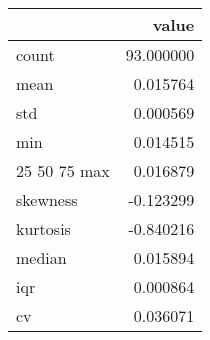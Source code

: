 \begin{tabular}{lr}
\toprule
 & value \\
\midrule
count & 93.000000 \\
mean & 0.015764 \\
std & 0.000569 \\
min & 0.014515 \\
25%
50%
75%
max & 0.016879 \\
skewness & -0.123299 \\
kurtosis & -0.840216 \\
median & 0.015894 \\
iqr & 0.000864 \\
cv & 0.036071 \\
\bottomrule
\end{tabular}
